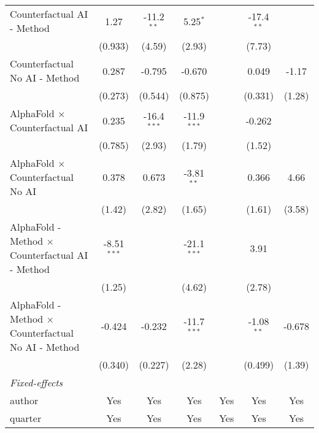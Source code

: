 \begin{tabular}{lcccccc}
   Counterfactual AI - Method                                 & 1.27          & -11.2$^{**}$  & 5.25$^{*}$    &           & -17.4$^{**}$ &   \\   
                                                              & (0.933)       & (4.59)        & (2.93)        &           & (7.73)       &   \\   
   Counterfactual No AI - Method                              & 0.287         & -0.795        & -0.670        &           & 0.049        & -1.17\\   
                                                              & (0.273)       & (0.544)       & (0.875)       &           & (0.331)      & (1.28)\\   
   AlphaFold $\times$ Counterfactual AI                       & 0.235         & -16.4$^{***}$ & -11.9$^{***}$ &           & -0.262       &   \\   
                                                              & (0.785)       & (2.93)        & (1.79)        &           & (1.52)       &   \\   
   AlphaFold $\times$ Counterfactual No AI                    & 0.378         & 0.673         & -3.81$^{**}$  &           & 0.366        & 4.66\\   
                                                              & (1.42)        & (2.82)        & (1.65)        &           & (1.61)       & (3.58)\\   
   AlphaFold - Method $\times$ Counterfactual AI - Method     & -8.51$^{***}$ &               & -21.1$^{***}$ &           & 3.91         &   \\   
                                                              & (1.25)        &               & (4.62)        &           & (2.78)       &   \\   
   AlphaFold - Method $\times$ Counterfactual No AI - Method  & -0.424        & -0.232        & -11.7$^{***}$ &           & -1.08$^{**}$ & -0.678\\   
                                                              & (0.340)       & (0.227)       & (2.28)        &           & (0.499)      & (1.39)\\   
   \midrule
   \emph{Fixed-effects}\\
   author                                                     & Yes           & Yes           & Yes           & Yes       & Yes          & Yes\\  
   quarter                                                    & Yes           & Yes           & Yes           & Yes       & Yes          & Yes\\  

\end{tabular}
